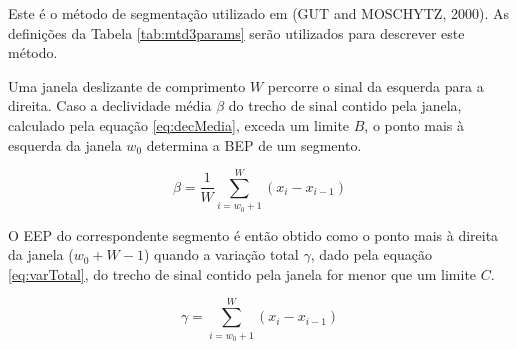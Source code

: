 \documentclass[
	12pt,				%
	openright,			%
	oneside,
	a4paper,			%
	english,			%
	francais,			%
	spanish,			%
	brazil				%
	]{abntex2}
\begin{document}
	Este é o método de segmentação utilizado em (GUT and MOSCHYTZ, 2000). As definições da Tabela \ref{tab:mtd3params} serão utilizados para descrever este método.
	
\begin{table}[htb]
\end{table}
	
	Uma janela deslizante de comprimento $W$ percorre o sinal da esquerda para a direita. Caso a declividade média $\beta$ do trecho de sinal contido pela janela, calculado pela equação \ref{eq:decMedia}, exceda um limite $B$, o ponto mais à esquerda da janela $w_0$ determina a BEP de um segmento.
	
\begin{equation}
\label{eq:decMedia}
	\beta = \frac{1}{W}\sum_{i=w_0+1}^{W}(x_i - x_{i-1})
\end{equation}
	
	O EEP do correspondente segmento é então obtido como o ponto mais à direita da janela ($w_0 + W - 1$) quando a variação total $\gamma$, dado pela equação \ref{eq:varTotal}, do trecho de sinal contido pela janela for menor que um limite $C$.

\begin{equation}
\label{eq:varTotal}
	\gamma = \sum_{i=w_0+1}^{W}(x_i - x_{i-1})
\end{equation}
	
\end{document}
